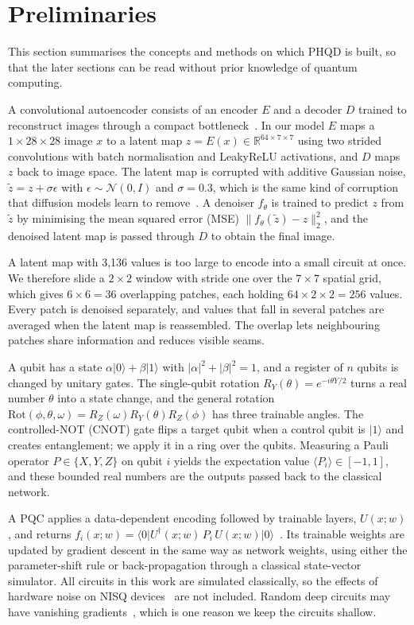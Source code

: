 \section{Preliminaries}\label{sec:prelim}
This section summarises the concepts and methods on which PHQD is built, so that the later sections can be read without prior knowledge of quantum computing.

A convolutional autoencoder consists of an encoder $E$ and a decoder $D$ trained to reconstruct images through a compact bottleneck~\cite{rombach}. In our model $E$ maps a $1\times28\times28$ image $x$ to a latent map $z=E(x)\in\mathbb{R}^{64\times7\times7}$ using two strided convolutions with batch normalisation and LeakyReLU activations, and $D$ maps $z$ back to image space. The latent map is corrupted with additive Gaussian noise, $\tilde z=z+\sigma\epsilon$ with $\epsilon\sim\mathcal{N}(0,I)$ and $\sigma=0.3$, which is the same kind of corruption that diffusion models learn to remove~\cite{ho}. A denoiser $f_\theta$ is trained to predict $z$ from $\tilde z$ by minimising the mean squared error (MSE) $\lVert f_\theta(\tilde z)-z\rVert_2^2$, and the denoised latent map is passed through $D$ to obtain the final image.

A latent map with 3,136 values is too large to encode into a small circuit at once. We therefore slide a $2\times2$ window with stride one over the $7\times7$ spatial grid, which gives $6\times6=36$ overlapping patches, each holding $64\times2\times2=256$ values. Every patch is denoised separately, and values that fall in several patches are averaged when the latent map is reassembled. The overlap lets neighbouring patches share information and reduces visible seams.

A qubit has a state $\alpha\lvert0\rangle+\beta\lvert1\rangle$ with $\lvert\alpha\rvert^2+\lvert\beta\rvert^2=1$, and a register of $n$ qubits is changed by unitary gates. The single-qubit rotation $R_Y(\theta)=e^{-i\theta Y/2}$ turns a real number $\theta$ into a state change, and the general rotation $\mathrm{Rot}(\phi,\theta,\omega)=R_Z(\omega)R_Y(\theta)R_Z(\phi)$ has three trainable angles. The controlled-NOT (CNOT) gate flips a target qubit when a control qubit is $\lvert1\rangle$ and creates entanglement; we apply it in a ring over the qubits. Measuring a Pauli operator $P\in\{X,Y,Z\}$ on qubit $i$ yields the expectation value $\langle P_i\rangle\in[-1,1]$, and these bounded real numbers are the outputs passed back to the classical network.

A PQC applies a data-dependent encoding followed by trainable layers, $U(x;w)$, and returns $f_i(x;w)=\langle0\rvert U^\dagger(x;w)\,P_i\,U(x;w)\lvert0\rangle$~\cite{cerezo,benedetti}. Its trainable weights are updated by gradient descent in the same way as network weights, using either the parameter-shift rule or back-propagation through a classical state-vector simulator. All circuits in this work are simulated classically, so the effects of hardware noise on NISQ devices~\cite{preskill} are not included. Random deep circuits may have vanishing gradients~\cite{mcclean}, which is one reason we keep the circuits shallow.

